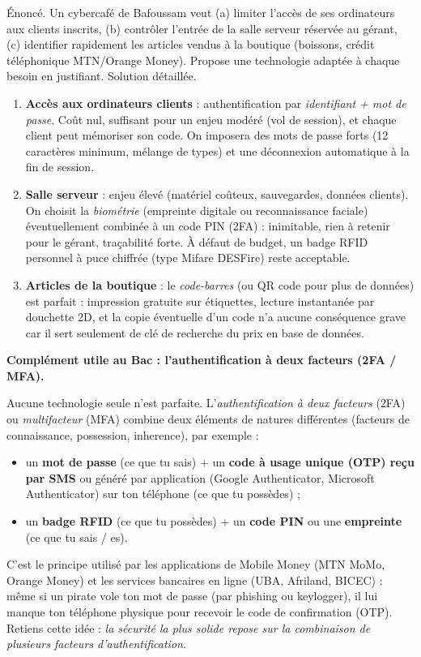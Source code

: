 \documentclass[11pt]{article}
\newcommand{\cle}[1]{{\popxbold\color{popdark}#1}}
\begin{document}
\begin{exoresolu}
Énoncé. Un cybercafé de Bafoussam veut (a) limiter l'accès de ses ordinateurs aux clients inscrits, (b) contrôler l'entrée de la salle serveur réservée au gérant, (c) identifier rapidement les articles vendus à la boutique (boissons, crédit téléphonique MTN/Orange Money). Propose une technologie adaptée à chaque besoin en justifiant.
\tcblower
Solution détaillée.
\begin{enumerate}
  \item \textbf{Accès aux ordinateurs clients} : authentification par \emph{identifiant + mot de passe}. Coût nul, suffisant pour un enjeu modéré (vol de session), et chaque client peut mémoriser son code. On imposera des mots de passe forts (12 caractères minimum, mélange de types) et une déconnexion automatique à la fin de session.
  \item \textbf{Salle serveur} : enjeu élevé (matériel coûteux, sauvegardes, données clients). On choisit la \emph{biométrie} (empreinte digitale ou reconnaissance faciale) éventuellement combinée à un code PIN (2FA) : inimitable, rien à retenir pour le gérant, traçabilité forte. À défaut de budget, un badge RFID personnel à puce chiffrée (type Mifare DESFire) reste acceptable.
  \item \textbf{Articles de la boutique} : le \emph{code-barres} (ou QR code pour plus de données) est parfait : impression gratuite sur étiquettes, lecture instantanée par douchette 2D, et la copie éventuelle d'un code n'a aucune conséquence grave car il sert seulement de clé de recherche du prix en base de données.
\end{enumerate}
\end{exoresolu}

\textbf{Complément utile au Bac : l'authentification à deux facteurs (2FA / MFA).}\par
Aucune technologie seule n'est parfaite. L'\emph{authentification à deux facteurs} (\cle{2FA}) ou \emph{multifacteur} (\cle{MFA}) combine deux éléments de natures différentes (facteurs de connaissance, possession, inherence), par exemple :
\begin{itemize}
  \item un \textbf{mot de passe} (ce que tu sais) + un \textbf{code à usage unique (OTP) reçu par SMS} ou généré par application (Google Authenticator, Microsoft Authenticator) sur ton téléphone (ce que tu possèdes) ;
  \item un \textbf{badge RFID} (ce que tu possèdes) + un \textbf{code PIN} ou une \textbf{empreinte} (ce que tu sais / es).
\end{itemize}
C'est le principe utilisé par les applications de Mobile Money (MTN MoMo, Orange Money) et les services bancaires en ligne (UBA, Afriland, BICEC) : même si un pirate vole ton mot de passe (par phishing ou keylogger), il lui manque ton téléphone physique pour recevoir le code de confirmation (OTP). Retiens cette idée : \emph{la sécurité la plus solide repose sur la combinaison de plusieurs facteurs d'authentification}.
\end{document}
